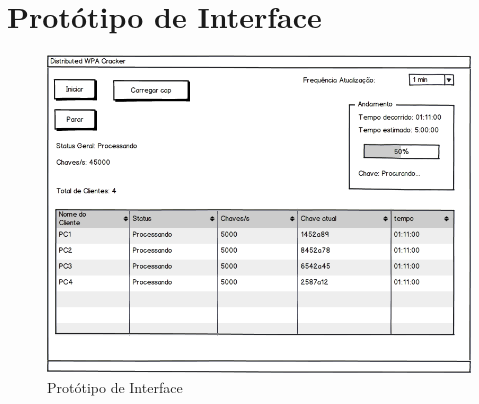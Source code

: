 \documentclass[12pt,a4paper]{abnt}
\begin{document}
			
		
		\clearpage
		\section{Protótipo de Interface}
		
			\begin{figure}[htp]
				\begin{center}
				  \includegraphics[width=450px]{mockup}
				  \caption{Protótipo de Interface}
				  \label{fig:prototipoInterface}
				\end{center}
			\end{figure}
			\FloatBarrier
		
\end{document}

